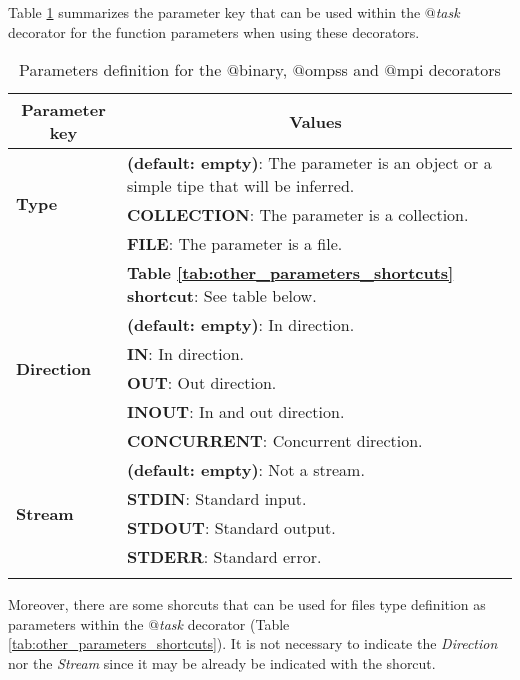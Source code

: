 Table \ref{tab:other_parameters} summarizes the parameter key that can be used within the {\it $@$task} decorator for the 
function parameters when using these decorators.

\bgroup
  \def\arraystretch{1.5}%
  \begin{longtable}{| p{} | p{} |}
    \hline
    \multicolumn{1}{|c|}{{\bf Parameter key}} &  \multicolumn{1}{c|}{{\bf Values }}\\
    \hline
        \multirow{3}{*}{{\bf Type}} & {\bf (default: empty)}: The parameter is an object or a simple tipe that will be inferred. \\
                                    & {\bf COLLECTION}: The parameter is a collection. \\
                                    & {\bf FILE}: The parameter is a file. \\
                                    & {\bf Table \ref{tab:other_parameters_shortcuts} shortcut}: See table below.\\
    \hline
        \multirow{4}{*}{{\bf Direction}} & {\bf (default: empty)}: In direction. \\
                                         & {\bf IN}: In direction. \\
                                         & {\bf OUT}: Out direction. \\
                                         & {\bf INOUT}: In and out direction. \\
                                         & {\bf CONCURRENT}: Concurrent direction. \\
    \hline
        \multirow{4}{*}{{\bf Stream}} & {\bf (default: empty)}: Not a stream. \\
                                      & {\bf STDIN}: Standard input. \\
                                      & {\bf STDOUT}: Standard output. \\
                                      & {\bf STDERR}: Standard error. \\
    \hline
     \caption{Parameters definition for the $@$binary, $@$ompss and $@$mpi decorators}
    \label{tab:other_parameters}
  \end{longtable}
\egroup

Moreover, there are some shorcuts that can be used for files type definition as parameters within the {\it $@$task} decorator (Table \ref{tab:other_parameters_shortcuts}).
It is not necessary to indicate the {\it Direction} nor the {\it Stream} since it may be already be indicated with the shorcut.

